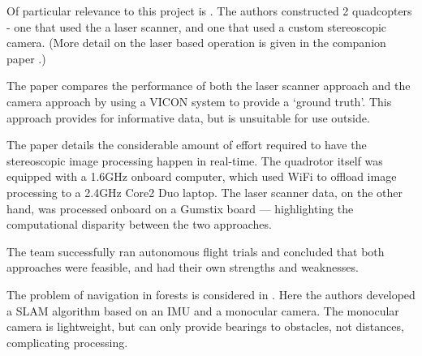 \documentclass[12pt,oneside,a4paper]{book}
\begin{document}
Of particular relevance to this project is \cite{achtelik2009stereo}. The authors
constructed 2 quadcopters - one that used the a laser scanner, and one
that used a custom stereoscopic camera. (More detail on the laser
based operation is given in the companion paper
\cite{Bachrach09autonomousflight}.) 

The paper compares the performance of both the laser scanner
approach and the camera approach by using a VICON system to provide a
`ground truth'. This approach provides for informative data, but is
unsuitable for use outside.

The paper details the considerable amount of effort required to have
the stereoscopic image processing happen in real-time. The quadrotor
itself was equipped with a 1.6GHz onboard computer, which used WiFi to
offload image processing to a 2.4GHz Core2 Duo laptop. The laser
scanner data, on the other hand, was processed onboard on a Gumstix
board --- highlighting the computational disparity between the two
approaches.


The team successfully ran autonomous flight trials and concluded that
both approaches were feasible, and had their own strengths and
weaknesses.




The problem of navigation in forests is considered in
\cite{langelaan2005towards}. Here the authors developed a SLAM
algorithm based on an IMU and a monocular camera. The monocular camera
is lightweight, but can only provide bearings to obstacles, not
distances, complicating processing.
\end{document}

